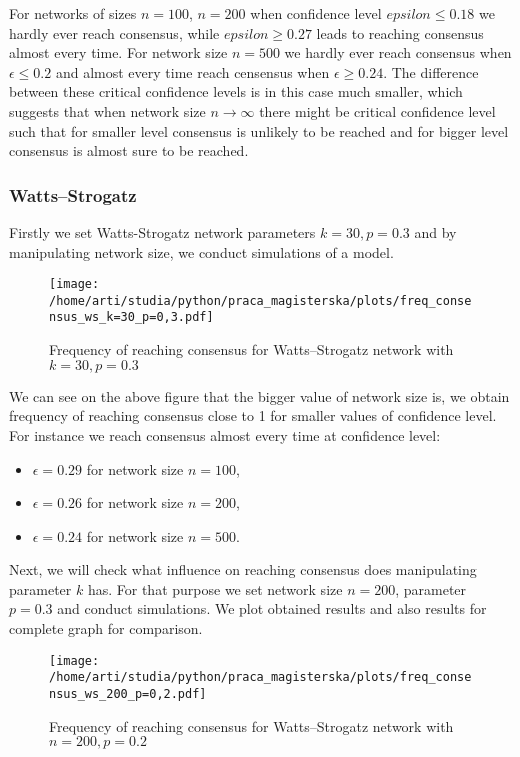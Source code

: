 \documentclass{article}
\begin{document}
For networks of sizes $n=100$, $n=200$ when confidence level $epsilon\leq0.18$ we hardly ever reach consensus, while $epsilon\geq0.27$ leads to reaching consensus almost every time.
For network size $n=500$ we hardly ever reach consensus when $\epsilon\leq0.2$ and almost every time reach censensus when $\epsilon\geq0.24$. The difference between these critical confidence levels is in this case much smaller, which suggests that when network size $n \to \infty$ there might be critical confidence level such that for smaller level consensus is unlikely to be reached and for bigger level consensus is almost sure to be reached. 

\subsubsection{Watts--Strogatz}

Firstly we set Watts-Strogatz network parameters $k=30, p=0.3$ and by manipulating network size, we conduct simulations of a model.

\begin{figure}[H]
		\centering
		\texttt{[image: /home/arti/studia/python/praca\_magisterska/plots/freq\_consensus\_ws\_k=30\_p=0,3.pdf]}
		\caption{Frequency of reaching consensus for Watts--Strogatz network with $k=30, p=0.3$}
\end{figure}

We can see on the above figure that the bigger value of network size is, we obtain frequency of reaching consensus close to 1 for smaller values of confidence level. For instance we reach consensus almost every time at confidence level:
\begin{itemize}
\item  $\epsilon=0.29$ for network size $n=100$,
\item  $\epsilon=0.26$ for network size $n=200$,
\item  $\epsilon=0.24$ for network size $n=500$.
\end{itemize}
\indent

Next, we will check what influence on reaching consensus does manipulating parameter $k$ has. For that purpose we set network size $n=200$, parameter $p=0.3$ and conduct simulations. We plot obtained results and also results for complete graph for comparison.

\begin{figure}[H]
		\centering
		\texttt{[image: /home/arti/studia/python/praca\_magisterska/plots/freq\_consensus\_ws\_200\_p=0,2.pdf]}
		\caption{Frequency of reaching consensus for Watts--Strogatz network with $n=200, p=0.2$}
		\label{freq_ws}
\end{figure}
\end{document}
